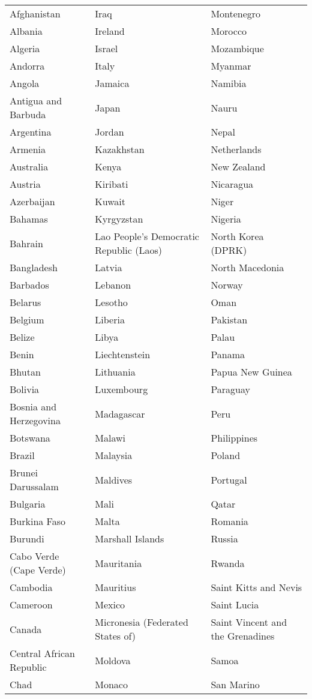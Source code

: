 \documentclass[11pt]{article}
\begin{document}
\begin{longtable}{@{}p{} p{} p{}@{}}
Afghanistan & Iraq & Montenegro \\
Albania & Ireland & Morocco \\
Algeria & Israel & Mozambique \\
Andorra & Italy & Myanmar \\
Angola & Jamaica & Namibia \\
Antigua and Barbuda & Japan & Nauru \\
Argentina & Jordan & Nepal \\
Armenia & Kazakhstan & Netherlands \\
Australia & Kenya & New Zealand \\
Austria & Kiribati & Nicaragua \\
Azerbaijan & Kuwait & Niger \\
Bahamas & Kyrgyzstan & Nigeria \\
Bahrain & Lao People's Democratic Republic (Laos) & North Korea (DPRK) \\
Bangladesh & Latvia & North Macedonia \\
Barbados & Lebanon & Norway \\
Belarus & Lesotho & Oman \\
Belgium & Liberia & Pakistan \\
Belize & Libya & Palau \\
Benin & Liechtenstein & Panama \\
Bhutan & Lithuania & Papua New Guinea \\
Bolivia & Luxembourg & Paraguay \\
Bosnia and Herzegovina & Madagascar & Peru \\
Botswana & Malawi & Philippines \\
Brazil & Malaysia & Poland \\
Brunei Darussalam & Maldives & Portugal \\
Bulgaria & Mali & Qatar \\
Burkina Faso & Malta & Romania \\
Burundi & Marshall Islands & Russia \\
Cabo Verde (Cape Verde) & Mauritania & Rwanda \\
Cambodia & Mauritius & Saint Kitts and Nevis \\
Cameroon & Mexico & Saint Lucia \\
Canada & Micronesia (Federated States of) & Saint Vincent and the Grenadines \\
Central African Republic & Moldova & Samoa \\
Chad & Monaco & San Marino \\

\end{longtable}
\end{document}
